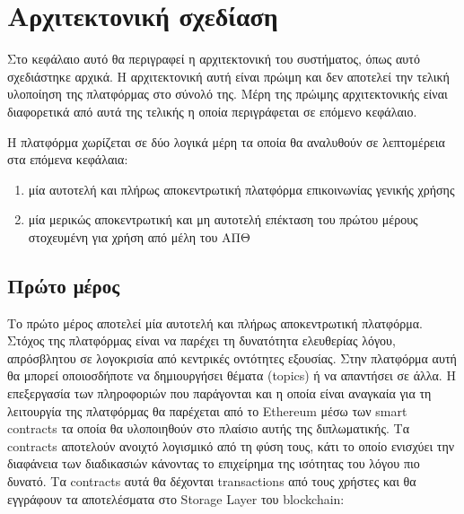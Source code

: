 \section{Αρχιτεκτονική σχεδίαση} \label{section:3-7-architecture-design}

Στο κεφάλαιο αυτό θα περιγραφεί η αρχιτεκτονική του συστήματος, όπως αυτό σχεδιάστηκε αρχικά. Η αρχιτεκτονική αυτή είναι πρώιμη και δεν αποτελεί την τελική υλοποίηση της πλατφόρμας στο σύνολό της. Μέρη της πρώιμης αρχιτεκτονικής είναι διαφορετικά από αυτά της τελικής η οποία περιγράφεται σε επόμενο κεφάλαιο.



Η πλατφόρμα χωρίζεται σε δύο λογικά μέρη τα οποία θα αναλυθούν σε λεπτομέρεια στα επόμενα κεφάλαια:

\begin{enumerate}
    \item μία αυτοτελή και πλήρως αποκεντρωτική πλατφόρμα επικοινωνίας γενικής χρήσης
    \item μία μερικώς αποκεντρωτική και μη αυτοτελή επέκταση του πρώτου μέρους στοχευμένη για χρήση από μέλη του ΑΠΘ
\end{enumerate}

\subsection{Πρώτο μέρος} \label{subsection:3-1-first-part}

Το πρώτο μέρος αποτελεί μία αυτοτελή και πλήρως αποκεντρωτική πλατφόρμα. Στόχος της πλατφόρμας είναι να παρέχει τη
δυνατότητα ελευθερίας λόγου, απρόσβλητου σε λογοκρισία από κεντρικές οντότητες εξουσίας. Στην πλατφόρμα αυτή θα μπορεί
οποιοσδήποτε να δημιουργήσει θέματα (topics) ή να απαντήσει σε άλλα. Η επεξεργασία των πληροφοριών που παράγονται και η
οποία είναι αναγκαία για τη λειτουργία της πλατφόρμας θα παρέχεται από το Ethereum μέσω των smart contracts τα οποία θα
υλοποιηθούν στο πλαίσιο αυτής της διπλωματικής. Τα contracts αποτελούν ανοιχτό λογισμικό από τη φύση τους, κάτι το οποίο
ενισχύει την διαφάνεια των διαδικασιών κάνοντας το επιχείρημα της ισότητας του λόγου πιο δυνατό. Τα contracts αυτά θα
δέχονται transactions από τους χρήστες και θα εγγράφουν τα αποτελέσματα στο Storage Layer του blockchain:


